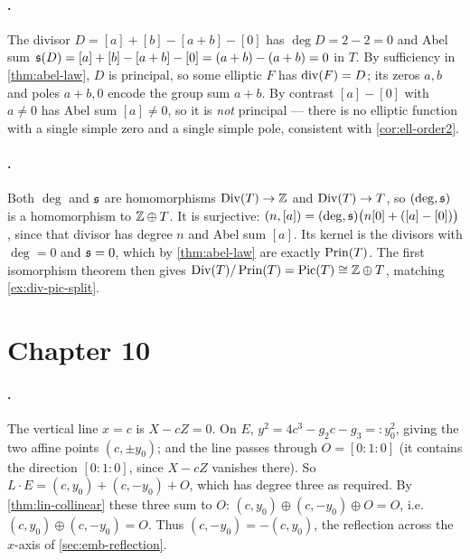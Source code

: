 \paragraph{.}
The divisor \(D = [a] + [b] - [a+b] - [0]\) has \(\deg D = 2 - 2 = 0\) and Abel
sum \(\mathfrak{s}(D) = [a] + [b] - [a+b] - [0] = (a + b) - (a+b) = 0\) in \(T\). By
sufficiency in \cref{thm:abel-law}, \(D\) is principal, so some elliptic \(F\) has
\(\operatorname{div}(F) = D\); its zeros \(a, b\) and poles \(a+b, 0\) encode the
group sum \(a + b\). By contrast \([a] - [0]\) with \(a \ne 0\) has Abel sum
\([a] \ne 0\), so it is \emph{not} principal --- there is no elliptic function with
a single simple zero and a single simple pole, consistent with
\cref{cor:ell-order2}.

\paragraph{.}
Both \(\deg\) and \(\mathfrak{s}\) are homomorphisms \(\operatorname{Div}(T) \to \mathbb{Z}\) and
\(\operatorname{Div}(T) \to T\), so \((\deg, \mathfrak{s})\) is a homomorphism to \(\mathbb{Z} \oplus T\). It
is surjective: \((n, [a]) = (\deg, \mathfrak{s})\bigl(n[0] + ([a] - [0])\bigr)\), since
that divisor has degree \(n\) and Abel sum \([a]\). Its kernel is the divisors
with \(\deg = 0\) and \(\mathfrak{s} = 0\), which by \cref{thm:abel-law} are exactly
\(\operatorname{Prin}(T)\). The first isomorphism theorem then gives \(\operatorname{Div}(T)/\operatorname{Prin}(T) =
\operatorname{Pic}(T) \cong \mathbb{Z} \oplus T\), matching \cref{ex:div-pic-split}.

\section{Chapter 10}
\label{sec:soln-ch10}

\paragraph{.}
The vertical line \(x = c\) is \(X - cZ = 0\). On \(E\), \(y^2 = 4c^3 - g_2 c - g_3
=: y_0^2\), giving the two affine points \((c, \pm y_0)\); and the line passes
through \(O = [0:1:0]\) (it contains the direction \([0:1:0]\), since
\(X - cZ\) vanishes there). So \(L \cdot E = (c, y_0) + (c, -y_0) + O\), which has
degree three as required. By \cref{thm:lin-collinear} these three sum to \(O\):
\((c, y_0) \oplus (c, -y_0) \oplus O = O\), i.e.\ \((c, y_0) \oplus (c, -y_0) = O\).
Thus \((c, -y_0) = -(c, y_0)\), the reflection across the \(x\)-axis of
\cref{sec:emb-reflection}.

